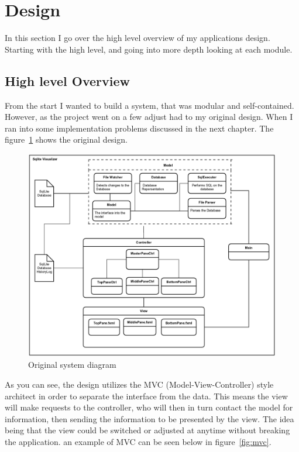 \section{Design}
\label{sec:design}

In this section I go over the high level overview of my applications design. Starting with the high level, and going into more depth looking at each module.

\subsection{High level Overview}
\label{subsec:high_level_overview}

From the start I wanted to build a system, that was modular and self-contained. However, as the project went on a few adjust had to my original design. When I ran into some implementation problems discussed in the next chapter. The figure~\ref{fig:design_old} shows the original design.

\begin{figure}[H]
	\centering
	\includegraphics[scale=0.2]{images/system_diagram_old.png}
	\caption{Original system diagram}
	\label{fig:design_old}
\end{figure}

As you can see, the design utilizes the MVC (Model-View-Controller) style architect in order to separate the interface from the data. This means the view will make requests to the controller, who will then in turn contact the model for information, then sending the information to be presented by the view. The idea being that the view could be switched or adjusted at anytime without breaking the application. an example of MVC can be seen below in figure~\ref{fig:mvc}.

